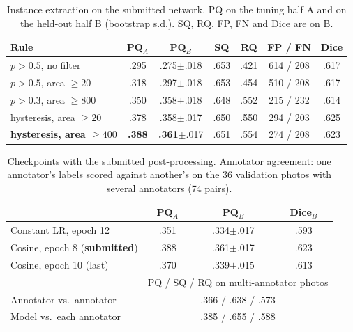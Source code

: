 \documentclass[sigconf]{acmart}
\begin{document}
\begin{table}[t]
\caption{Instance extraction on the submitted network. PQ on the tuning half A and on the held-out half B (bootstrap s.d.). SQ, RQ, FP, FN and Dice are on B.}
\label{tab:postproc}
\small
\setlength{\tabcolsep}{3pt}
\begin{tabular}{@{}lcccccc@{}}
\toprule
Rule & PQ$_A$ & PQ$_B$ & SQ & RQ & FP / FN & Dice \\
\midrule
$p>0.5$, no filter          & .295 & .275{\scriptsize$\pm$.018} & .653 & .421 & 614 / 208 & .617 \\
$p>0.5$, area $\ge20$       & .318 & .297{\scriptsize$\pm$.018} & .653 & .454 & 510 / 208 & .617 \\
$p>0.3$, area $\ge800$      & .350 & .358{\scriptsize$\pm$.018} & .648 & .552 & 215 / 232 & .614 \\
hysteresis, area $\ge20$    & .378 & .358{\scriptsize$\pm$.017} & .650 & .550 & 294 / 203 & .625 \\
\textbf{hysteresis, area $\ge400$} & \textbf{.388} & \textbf{.361}{\scriptsize$\pm$.017} & .651 & .554 & 274 / 208 & .623 \\
\bottomrule
\end{tabular}
\end{table}

\begin{table}[t]
\caption{Checkpoints with the submitted post-processing. Annotator agreement: one annotator's labels scored against another's on the 36 validation photos with several annotators (74 pairs).}
\label{tab:models}
\small
\setlength{\tabcolsep}{4pt}
\begin{tabular}{@{}lccc@{}}
\toprule
 & PQ$_A$ & PQ$_B$ & Dice$_B$ \\
\midrule
Constant LR, epoch 12        & .351 & .334{\scriptsize$\pm$.017} & .593 \\
Cosine, epoch 8 (\textbf{submitted}) & .388 & .361{\scriptsize$\pm$.017} & .623 \\
Cosine, epoch 10 (last)      & .370 & .339{\scriptsize$\pm$.015} & .613 \\
\midrule
 & \multicolumn{3}{c}{PQ / SQ / RQ on multi-annotator photos} \\
Annotator vs.\ annotator     & \multicolumn{3}{c}{.366 / .638 / .573} \\
Model vs.\ each annotator    & \multicolumn{3}{c}{.385 / .655 / .588} \\
\bottomrule
\end{tabular}
\end{table}
\end{document}
